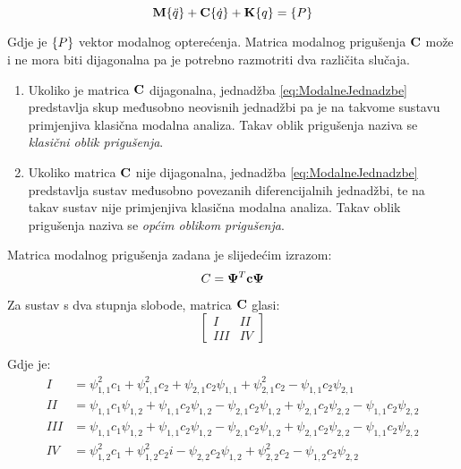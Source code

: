 \begin{equation}\label{eq:ModalneJednadzbe}
    \M\vtor{q}{:} + \C\vtor{q}{.} + \K\vtor{q}{} = \vtor{P}{}
\end{equation}

Gdje je $\vtor{P}{}$ vektor modalnog opterećenja. Matrica modalnog prigušenja $\mathbf{C}$ može 
i ne mora biti dijagonalna pa je potrebno razmotriti dva različita slučaja.
    \begin{enumerate}
        \item Ukoliko je matrica $\mathbf{C}$ dijagonalna, jednadžba
            \eqref{eq:ModalneJednadzbe} predstavlja skup međusobno neovisnih
            jednadžbi pa je na takvome sustavu primjenjiva klasična modalna analiza.
            Takav oblik prigušenja naziva se \textit{klasični oblik prigušenja}.
            
        \item Ukoliko matrica $\mathbf{C}$ nije dijagonalna, jednadžba
            \eqref{eq:ModalneJednadzbe} predstavlja sustav međusobno povezanih
            diferencijalnih jednadžbi, te na takav sustav nije primjenjiva klasična
            modalna analiza. Takav oblik prigušenja naziva se \textit{općim oblikom
            prigušenja}.
    \end{enumerate}

Matrica modalnog prigušenja zadana je slijedećim izrazom:
\begin{equation}\label{eq:ModalnoPrigusenje}
    C = \mathbf{\Psi}^T \mathbf{c} \mathbf{\Psi}
\end{equation}

Za sustav s dva stupnja slobode, matrica $\mathbf{C}$ glasi:
\begin{equation}
    \begin{bmatrix}
        I & II\\
        III & IV
    \end{bmatrix}
\end{equation}

Gdje je:
\begin{align*}
    I  &= \psi_{1,1}^2c_1+\psi_{1,1}^2c_2+\psi_{2,1}c_2\psi_{1,1}+\psi_{2,1}^2c_2-\psi_{1,1}c_2\psi_{2,1}\\
    II &= \psi_{1,1}c_1\psi_{1,2}+\psi_{1,1}c_2\psi_{1,2}-\psi_{2,1}c_2\psi_{1,2}+\psi_{2,1}c_2\psi_{2,2}-\psi_{1,1}c_2\psi_{2,2}\\
    III&= \psi_{1,1}c_1\psi_{1,2}+\psi_{1,1}c_2\psi_{1,2}-\psi_{2,1}c_2\psi_{1,2}+\psi_{2,1}c_2\psi_{2,2}-\psi_{1,1}c_2\psi_{2,2}\\
    IV &= \psi_{1,2}^2c_1+\psi_{1,2}^2c_2i-\psi_{2,2}c_2\psi_{1,2}+\psi_{2,2}^2c_2-\psi_{1,2}c_2\psi_{2,2}
\end{align*}

